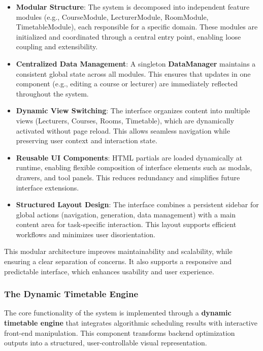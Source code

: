 \documentclass[11pt,a4paper]{article}
\begin{document}
\begin{itemize}
    \item \textbf{Modular Structure}: The system is decomposed into independent feature modules (e.g., CourseModule, LecturerModule, RoomModule, TimetableModule), each responsible for a specific domain. These modules are initialized and coordinated through a central entry point, enabling loose coupling and extensibility.
    
    \item \textbf{Centralized Data Management}: A singleton \textbf{DataManager} maintains a consistent global state across all modules. This ensures that updates in one component (e.g., editing a course or lecturer) are immediately reflected throughout the system.
    
    \item \textbf{Dynamic View Switching}: The interface organizes content into multiple views (Lecturers, Courses, Rooms, Timetable), which are dynamically activated without page reload. This allows seamless navigation while preserving user context and interaction state.
    
    \item \textbf{Reusable UI Components}: HTML partials are loaded dynamically at runtime, enabling flexible composition of interface elements such as modals, drawers, and tool panels. This reduces redundancy and simplifies future interface extensions.
    
    \item \textbf{Structured Layout Design}: The interface combines a persistent sidebar for global actions (navigation, generation, data management) with a main content area for task-specific interaction. This layout supports efficient workflows and minimizes user disorientation.
    
\end{itemize}
This modular architecture improves maintainability and scalability, while ensuring a clear separation of concerns.
It also supports a responsive and predictable interface, which enhances usability and user experience.



\subsubsection{The Dynamic Timetable Engine}

The core functionality of the system is implemented through a \textbf{dynamic timetable engine} that integrates algorithmic scheduling results with interactive front-end manipulation. This component transforms backend optimization outputs into a structured, user-controllable visual representation.
\end{document}

